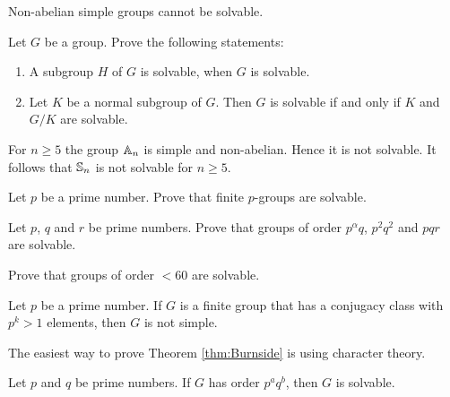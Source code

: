 \begin{example}
	Non-abelian simple groups cannot be solvable. 
\end{example}

\begin{exercise}
	\label{xca:solvable}
	Let $G$ be a group. Prove the following statements:
	\begin{enumerate}
		\item A subgroup $H$ of $G$ is solvable, when $G$ is solvable.
		\item Let $K$ be a normal subgroup of $G$. 
		    Then $G$ is solvable if and only if $K$ and $G/K$ are solvable.
	\end{enumerate}
\end{exercise}

\begin{example}
    For $n\geq5$ the group $\mathbb{A}_n$ is simple and non-abelian. Hence it 
    is not solvable. It follows that 
    $\mathbb{S}_n$ is not solvable for $n\geq5$. 
\end{example}

\begin{exercise}
\label{xca:pgroups_solvable}
Let $p$ be a prime number. Prove that finite $p$-groups are solvable.
\end{exercise}

\begin{exercise}
\label{xca:Robinson:5.4.1}
    Let $p$, $q$ and $r$ be prime numbers. Prove that groups
    of order $p^\alpha q$, $p^2q^2$ and $pqr$ are solvable. 
\end{exercise}

\begin{exercise}
\label{xca:less60}
    Prove that groups of order $<60$ are solvable. 
\end{exercise}


\begin{theorem}[Burnside]
        \label{thm:Burnside}
	Let $p$ be a prime number. If $G$ is a finite group that has 
        a conjugacy class with $p^k>1$ elements, then $G$ 
	is not simple.
\end{theorem}

The easiest way to prove Theorem \ref{thm:Burnside}
is using character theory. 

\begin{theorem}[Burnside]
  Let $p$ and $q$ be prime numbers. If $G$ has order $p^aq^b$, then $G$ is solvable.
\end{theorem}

